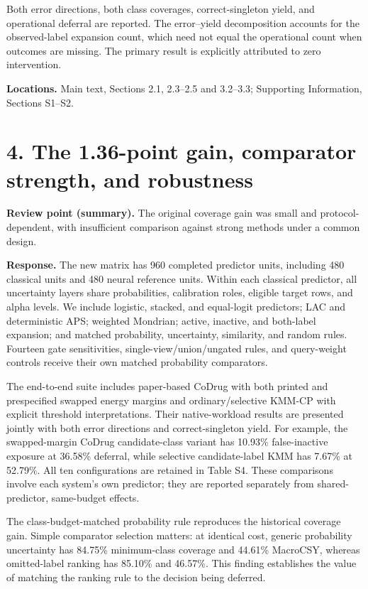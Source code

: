Both error directions, both class coverages, correct-singleton yield, and operational deferral are reported. The error--yield decomposition accounts for the observed-label expansion count, which need not equal the operational count when outcomes are missing. The primary result is explicitly attributed to zero intervention.

\textbf{Locations.} Main text, Sections 2.1, 2.3--2.5 and 3.2--3.3; Supporting Information, Sections S1--S2.

\section*{4. The 1.36-point gain, comparator strength, and robustness}
\noindent\textbf{Review point (summary).} The original coverage gain was small and protocol-dependent, with insufficient comparison against strong methods under a common design.

\textbf{Response.} The new matrix has 960 completed predictor units, including 480 classical units and 480 neural reference units. Within each classical predictor, all uncertainty layers share probabilities, calibration roles, eligible target rows, and alpha levels. We include logistic, stacked, and equal-logit predictors; LAC and deterministic APS; weighted Mondrian; active, inactive, and both-label expansion; and matched probability, uncertainty, similarity, and random rules. Fourteen gate sensitivities, single-view/union/ungated rules, and query-weight controls receive their own matched probability comparators.

The end-to-end suite includes paper-based CoDrug with both printed and prespecified swapped energy margins and ordinary/selective KMM-CP with explicit threshold interpretations. Their native-workload results are presented jointly with both error directions and correct-singleton yield. For example, the swapped-margin CoDrug candidate-class variant has 10.93\% false-inactive exposure at 36.58\% deferral, while selective candidate-label KMM has 7.67\% at 52.79\%. All ten configurations are retained in Table S4. These comparisons involve each system's own predictor; they are reported separately from shared-predictor, same-budget effects.

The class-budget-matched probability rule reproduces the historical coverage gain. Simple comparator selection matters: at identical cost, generic probability uncertainty has 84.75\% minimum-class coverage and 44.61\% MacroCSY, whereas omitted-label ranking has 85.10\% and 46.57\%. This finding establishes the value of matching the ranking rule to the decision being deferred.

